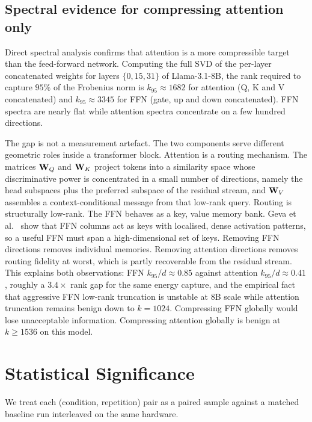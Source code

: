 \documentclass[11pt]{article}
\begin{document}
\subsection{Spectral evidence for compressing attention only}
\label{sec:spectra}
Direct spectral analysis confirms that attention is a more compressible
target than the feed-forward network. Computing the full SVD of the
per-layer concatenated weights for layers $\{0,15,31\}$ of Llama-3.1-8B,
the rank required to capture $95\%$ of the Frobenius norm is
$k_{95}\approx1682$ for attention (Q, K and V concatenated) and
$k_{95}\approx3345$ for FFN (gate, up and down concatenated). FFN spectra
are nearly flat \cite{geva2021ffn} while attention spectra concentrate on
a few hundred directions.

The gap is not a measurement artefact. The two components serve different
geometric roles inside a transformer block. Attention is a routing
mechanism. The matrices $\mathbf{W}_Q$ and $\mathbf{W}_K$ project tokens into a
similarity space whose discriminative power is concentrated in a small
number of directions, namely the head subspaces plus the preferred
subspace of the residual stream, and $\mathbf{W}_V$ assembles a
context-conditional message from that low-rank query. Routing is
structurally low-rank. The FFN behaves as a key, value memory bank.
Geva et al.\ \cite{geva2021ffn} show that FFN columns act as keys with
localised, dense activation patterns, so a useful FFN must span a
high-dimensional set of keys. Removing FFN directions removes individual
memories. Removing attention directions removes routing fidelity at
worst, which is partly recoverable from the residual stream. This
explains both observations: FFN $k_{95}/d\approx0.85$ against attention
$k_{95}/d\approx0.41$, roughly a $3.4\times$ rank gap for the same
energy capture, and the empirical fact that aggressive FFN low-rank
truncation is unstable at 8B scale while attention truncation remains
benign down to $k{=}1024$. Compressing FFN globally would lose
unacceptable information. Compressing attention globally is benign at
$k\geq1536$ on this model.
\FloatBarrier

\section{Statistical Significance}
\label{sec:stats}
We treat each (condition, repetition) pair as a paired sample against a
matched baseline run interleaved on the same hardware.
\end{document}
